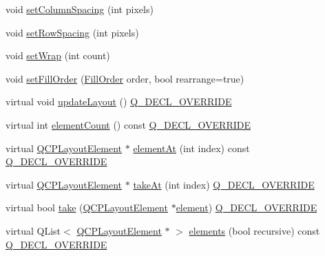 \begin{DoxyCompactItemize}
\item 
void \mbox{\hyperlink{class_q_c_p_layout_grid_a3a49272aba32bb0fddc3bb2a45a3dba0}{set\+Column\+Spacing}} (int pixels)
\item 
void \mbox{\hyperlink{class_q_c_p_layout_grid_aaef2cd2d456197ee06a208793678e436}{set\+Row\+Spacing}} (int pixels)
\item 
void \mbox{\hyperlink{class_q_c_p_layout_grid_ab36af18d77e4428386d02970382ee598}{set\+Wrap}} (int count)
\item 
void \mbox{\hyperlink{class_q_c_p_layout_grid_affc2f3cfd22f28698c5b29b960d2a391}{set\+Fill\+Order}} (\mbox{\hyperlink{class_q_c_p_layout_grid_a7d49ee08773de6b2fd246edfed353cca}{Fill\+Order}} order, bool rearrange=true)
\item 
virtual void \mbox{\hyperlink{class_q_c_p_layout_grid_a6cf43f14d3fa335fd8758561ccf1f78c}{update\+Layout}} () \mbox{\hyperlink{qcustomplot_8h_a42cc5eaeb25b85f8b52d2a4b94c56f55}{Q\+\_\+\+D\+E\+C\+L\+\_\+\+O\+V\+E\+R\+R\+I\+DE}}
\item 
virtual int \mbox{\hyperlink{class_q_c_p_layout_grid_a9a8942aface780a02445ebcf14c48513}{element\+Count}} () const \mbox{\hyperlink{qcustomplot_8h_a42cc5eaeb25b85f8b52d2a4b94c56f55}{Q\+\_\+\+D\+E\+C\+L\+\_\+\+O\+V\+E\+R\+R\+I\+DE}}
\item 
virtual \mbox{\hyperlink{class_q_c_p_layout_element}{Q\+C\+P\+Layout\+Element}} $\ast$ \mbox{\hyperlink{class_q_c_p_layout_grid_a4288f174082555f6bd92021bdedb75dc}{element\+At}} (int index) const \mbox{\hyperlink{qcustomplot_8h_a42cc5eaeb25b85f8b52d2a4b94c56f55}{Q\+\_\+\+D\+E\+C\+L\+\_\+\+O\+V\+E\+R\+R\+I\+DE}}
\item 
virtual \mbox{\hyperlink{class_q_c_p_layout_element}{Q\+C\+P\+Layout\+Element}} $\ast$ \mbox{\hyperlink{class_q_c_p_layout_grid_a17dd220234d1bbf8835abcc666384d45}{take\+At}} (int index) \mbox{\hyperlink{qcustomplot_8h_a42cc5eaeb25b85f8b52d2a4b94c56f55}{Q\+\_\+\+D\+E\+C\+L\+\_\+\+O\+V\+E\+R\+R\+I\+DE}}
\item 
virtual bool \mbox{\hyperlink{class_q_c_p_layout_grid_aee961c2eb6cf8a85dcbc5a7d7b6c1a00}{take}} (\mbox{\hyperlink{class_q_c_p_layout_element}{Q\+C\+P\+Layout\+Element}} $\ast$\mbox{\hyperlink{class_q_c_p_layout_grid_a602b426609b4411cf6a93c3ddf3a381a}{element}}) \mbox{\hyperlink{qcustomplot_8h_a42cc5eaeb25b85f8b52d2a4b94c56f55}{Q\+\_\+\+D\+E\+C\+L\+\_\+\+O\+V\+E\+R\+R\+I\+DE}}
\item 
virtual Q\+List$<$ \mbox{\hyperlink{class_q_c_p_layout_element}{Q\+C\+P\+Layout\+Element}} $\ast$ $>$ \mbox{\hyperlink{class_q_c_p_layout_grid_a7d5b968b4cf57393e9e387976d91f8f7}{elements}} (bool recursive) const \mbox{\hyperlink{qcustomplot_8h_a42cc5eaeb25b85f8b52d2a4b94c56f55}{Q\+\_\+\+D\+E\+C\+L\+\_\+\+O\+V\+E\+R\+R\+I\+DE}}

\end{DoxyCompactItemize}
